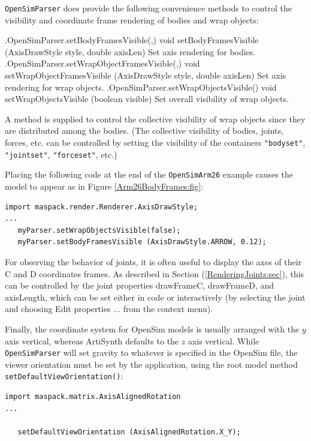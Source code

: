 {\tt OpenSimParser} does provide the following convenience methods to control
the visibility and coordinate frame rendering of bodies and wrap objects:
%
\begin{methodtable}{0.67}{0.33}
\midline
%
\methodentry
{\osim.OpenSimParser.setBodyFramesVisible(,)}%
{void setBodyFramesVisible (AxisDrawStyle style, double axisLen)}%
{Set axis rendering for bodies.}%
%
\methodentry
{\osim.OpenSimParser.setWrapObjectFramesVisible(,)}%
{void setWrapObjectFramesVisible (AxisDrawStyle style, double axisLen)}%
{Set axis rendering for wrap objects.}%
%
\methodentry
{\osim.OpenSimParser.setWrapObjectsVisible()}%
{void setWrapObjectsVisible (boolean visible)}%
{Set overall visibility of wrap objects.}%
%
\midline
\end{methodtable}
%
A method is supplied to control the collective visibility of wrap objects since
they are distributed among the bodies. (The collective visibility of
bodies, joints, forces, etc. can be controlled by setting the visibility of
the containers {\tt "bodyset"}, {\tt "jointset"}, {\tt "forceset"}, etc.)

Placing the following code at the end of the {\tt OpenSimArm26} example
causes the model to appear as in Figure \ref{Arm26BodyFrames:fig}:
%
\begin{lstlisting}[]
import maspack.render.Renderer.AxisDrawStyle;
...
   myParser.setWrapObjectsVisible(false);
   myParser.setBodyFramesVisible (AxisDrawStyle.ARROW, 0.12);
\end{lstlisting}
%

For observing the behavior of joints, it is often useful to display the axes
of their C and D coordinates frames. As described in Section
(\ref{RenderingJoints:sec}), this can be controlled by the joint properties
{\sf drawFrameC}, {\sf drawFrameD}, and {\sf axisLength}, which can be set
either in code or interactively (by selecting the joint and choosing {\sf Edit
properties ...} from the context menu).

Finally, the coordinate system for OpenSim models is usually arranged with the
$y$ axis vertical, whereas ArtiSynth defaults to the $z$ axis vertical.  While
{\tt OpenSimParser} will set gravity to whatever is specified in the OpenSim
file, the viewer orientation must be set by the application, using the root
model method {\tt setDefaultViewOrientation()}:
%
\begin{lstlisting}[]
import maspack.matrix.AxisAlignedRotation
...

   setDefaultViewOrientation (AxisAlignedRotation.X_Y);
\end{lstlisting}
%


